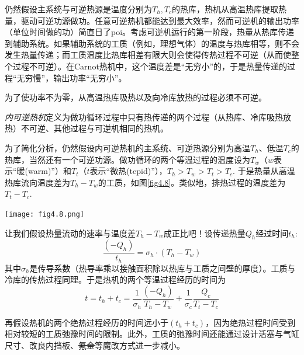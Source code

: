 仍然假设主系统与可逆热源是温度分别为$T_h, T_c$的热库，热机从高温热库提取热量，驱动可逆功源做功。任意可逆热机都能达到最大效率，然而可逆机的输出功率（单位时间做的功）简直日了poi。考虑可逆机运行的第一阶段，热量从热库传递到辅助系统。如果辅助系统的工质（例如，理想气体）的温度与热库相等，则不会发生热量传递；而工质温度比热库相差有限大则会使得传热过程不可逆（从而使整个过程不可逆）。在Carnot热机中，这个温度差是“无穷小”的，于是热量传递的过程“无穷慢”，输出功率“无穷小”。

为了使功率不为零，从高温热库吸热以及向冷库放热的过程必须不可逆。

{\it 内可逆热机}定义为做功循环过程中只有热传递的两个过程（从热库、冷库吸热放热）不可逆、其他过程与可逆机相同的热机。

为了简化分析，仍然假设内可逆热机的主系统、可逆热源分别为高温$T_h$、低温$T_c$的热库，当然还有一个可逆功源。做功循环的两个等温过程的温度设为$T_w$（$w$表示“暖(warm)”）和$T_t$（$t$表示“微热(tepid)”），$T_h > T_w > T_t > T_c$. 于是热量从高温热库流向温度差为$T_h - T_w$的工质，如图\ref{fig4.8}。类似地，排热过程的温度差为$T_t - T_c$.

{
	\centering
	\texttt{[image: fig4.8.png]}
	\label{fig4.8}
}

让我们假设热量流动的速率与温度差$T_h - T_w$成正比吧！设传递热量$Q_h$经过时间$t_h$:
\begin{equation}
	\frac{(-Q_h)}{t_h} = \sigma_h \cdot (T_h - T_w)
\label{equ4.23}
\end{equation}
其中$\sigma_h$是传导系数（热导率乘以接触面积除以热库与工质之间壁的厚度）。工质与冷库的传热过程同理。于是热机的两个等温过程经历的时间为
\begin{equation}
	t = t_h + t_c = \frac{1}{\sigma_h} \frac{(-Q_h)}{T_h - T_w} + \frac{1}{\sigma_c} \frac{Q_c}{T_t - T_c}
\label{equ4.24}
\end{equation}

再假设热机的两个绝热过程经历的时间远小于$(t_h + t_c)$，因为绝热过程时间受到相对较短的工质弛豫时间的限制。此外，工质的弛豫时间还能通过设计活塞与气缸尺寸、改良内挡板、\sout{氪金}等魔改方式进一步减小。


